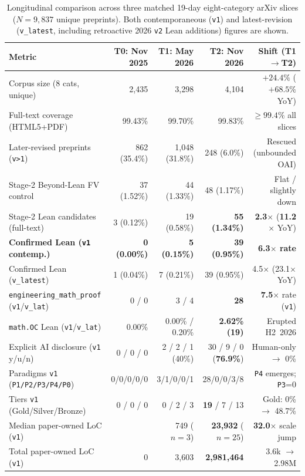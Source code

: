 \documentclass[11pt,letterpaper]{article}
\begin{document}
\begin{table}[t]
\centering
\caption{Longitudinal comparison across three matched 19-day eight-category arXiv slices ($N = 9{,}837$ unique preprints). Both contemporaneous (\texttt{v1}) and latest-revision (\texttt{v\_latest}, including retroactive 2026 \texttt{v2} Lean additions) figures are shown.}
\label{tab:longitudinal}
\scriptsize
\setlength{\tabcolsep}{3.4pt}
\begin{tabular}{lrrrr}
\toprule
\textbf{Metric} & \textbf{T0: Nov 2025} & \textbf{T1: May 2026} & \textbf{T2: Nov 2026} & \textbf{Shift (T1$\rightarrow$T2)} \\
\midrule
Corpus size (8 cats, unique) & 2,435 & 3,298 & 4,104 & $+24.4\%$ ($+68.5\%$ YoY) \\
Full-text coverage (HTML5+PDF) & 99.43\% & 99.70\% & 99.83\% & $\ge 99.4\%$ all slices \\
Later-revised preprints (\texttt{v>1}) & 862 (35.4\%) & 1,048 (31.8\%) & 248 (6.0\%) & Rescued (unbounded OAI) \\
\midrule
Stage-2 Beyond-Lean FV control & 37 (1.52\%) & 44 (1.33\%) & 48 (1.17\%) & Flat / slightly down \\
Stage-2 Lean candidates (full-text) & 3 (0.12\%) & 19 (0.58\%) & \textbf{55 (1.34\%)} & \textbf{2.3$\times$} (\textbf{11.2$\times$} YoY) \\
\textbf{Confirmed Lean (\texttt{v1} contemp.)} & \textbf{0 (0.00\%)} & \textbf{5 (0.15\%)} & \textbf{39 (0.95\%)} & \textbf{6.3$\times$ rate} \\
Confirmed Lean (\texttt{v\_latest}) & 1 (0.04\%) & 7 (0.21\%) & 39 (0.95\%) & 4.5$\times$ (23.1$\times$ YoY) \\
\texttt{engineering\_math\_proof} (\texttt{v1}/\texttt{v\_lat}) & 0 / 0 & 3 / 4 & \textbf{28} & \textbf{7.5$\times$} rate (\texttt{v1}) \\
\texttt{math.OC} Lean (\texttt{v1}/\texttt{v\_lat}) & 0.00\% & 0.00\% / 0.20\% & \textbf{2.62\% (19)} & Erupted H2~2026 \\
\midrule
Explicit AI disclosure (\texttt{v1} y/u/n) & 0 / 0 / 0 & 2 / 2 / 1 (40\%) & 30 / 9 / 0 (\textbf{76.9\%}) & Human-only $\rightarrow$ 0\% \\
Paradigms \texttt{v1} (\texttt{P1/P2/P3/P4/P0}) & 0/0/0/0/0 & 3/1/0/0/1 & 28/0/0/3/8 & \texttt{P4} emerges; \texttt{P3}=0 \\
Tiers \texttt{v1} (Gold/Silver/Bronze) & 0 / 0 / 0 & 0 / 2 / 3 & \textbf{19} / 7 / 13 & Gold: 0\% $\rightarrow$ 48.7\% \\
Median paper-owned LoC (\texttt{v1}) & \textemdash{} & 749 ($n=3$) & \textbf{23,932} ($n=25$) & \textbf{32.0$\times$} scale jump \\
Total paper-owned LoC (\texttt{v1}) & 0 & 3,603 & \textbf{2,981,464} & 3.6k $\rightarrow$ 2.98M \\
\bottomrule
\end{tabular}
\end{table}
\end{document}
